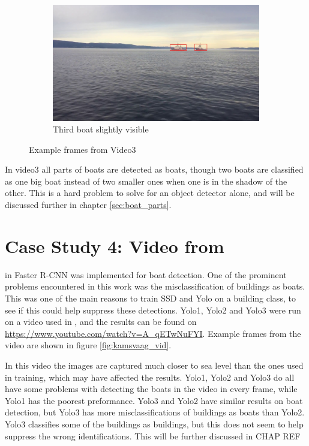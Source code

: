 \begin{figure}[h!]
\begin{subfigure}[b]{0.78\textwidth}
   \includegraphics[width=1\linewidth]{results/video/video3/frame208.jpg}
   \caption{Third boat slightly visible}
   \label{fig:video3_slightly}
\end{subfigure}
\caption{Example frames from Video3}
\label{fig:video3}
\end{figure}

\newpage

In video3 all parts of boats are detected as boats, though two boats are classified as one big boat instead of two smaller ones when one is in the shadow of the other. This is a hard problem to solve for an object detector alone, and will be discussed further in chapter \ref{sec:boat_parts}. 


\section{Case Study 4: Video from \citep{Kamsvag2018}}

in \citep{Kamsvag2018} Faster R-CNN was implemented for boat detection. One of the prominent problems encountered in this work was the misclassification of buildings as boats. This was one of the main reasons to train SSD and Yolo on a building class, to see if this could help suppress these detections. Yolo1, Yolo2 and Yolo3 were run on a video used in \citep{Kamsvag2018}, and the results can be found on \url{https://www.youtube.com/watch?v=A_qETwNuFYI}. Example frames from the video are shown in figure \ref{fig:kamsvaag_vid}.

\vspace{3mm}

In this video the images are captured much closer to sea level than the ones used in training, which may have affected the results. Yolo1, Yolo2 and Yolo3 do all have some problems with detecting the boats in the video in every frame, while Yolo1 has the poorest preformance. Yolo3 and Yolo2 have similar results on boat detection, but Yolo3 has more misclassifications of buildings as boats than Yolo2. Yolo3 classifies some of the buildings as buildings, but this does not seem to help suppress the wrong identifications. This will be further discussed in CHAP REF

